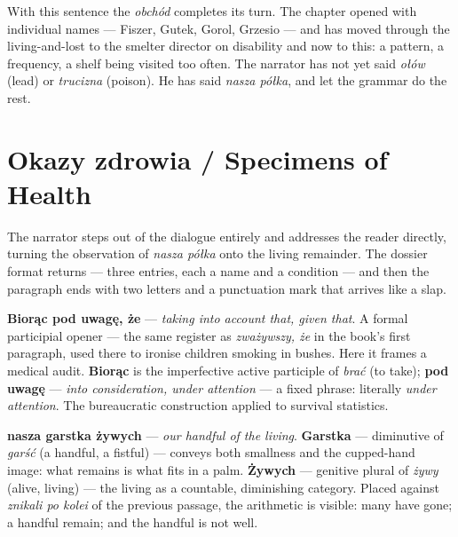 \medskip
With this sentence the \textit{obchód} completes its turn.
The chapter opened with individual names --- Fiszer,
Gutek, Gorol, Grzesio --- and has moved through the
living-and-lost to the smelter director on disability and
now to this: a pattern, a frequency, a shelf being
visited too often. The narrator has not yet said
\textit{ołów} (lead) or \textit{trucizna} (poison). He
has said \textit{nasza półka}, and let the grammar do
the rest.

\section{Okazy zdrowia / Specimens of Health}



The narrator steps out of the dialogue entirely and
addresses the reader directly, turning the observation
of \textit{nasza półka} onto the living remainder.
The dossier format returns --- three entries, each a
name and a condition --- and then the paragraph ends
with two letters and a punctuation mark that arrives
like a slap.

\textbf{Biorąc pod uwagę, że} --- \textit{taking into
account that, given that}. A formal participial opener ---
the same register as \textit{zważywszy, że} in the book's
first paragraph, used there to ironise children smoking in
bushes. Here it frames a medical audit. \textbf{Biorąc}
is the imperfective active participle of \textit{brać}
(to take); \textbf{pod uwagę} --- \textit{into
consideration, under attention} --- a fixed phrase:
literally \textit{under attention}. The bureaucratic
construction applied to survival statistics.

\textbf{nasza garstka żywych} --- \textit{our handful of
the living}. \textbf{Garstka} --- diminutive of
\textit{garść} (a handful, a fistful) --- conveys both
smallness and the cupped-hand image: what remains is
what fits in a palm. \textbf{Żywych} --- genitive plural
of \textit{żywy} (alive, living) --- the living as a
countable, diminishing category. Placed against
\textit{znikali po kolei} of the previous passage, the
arithmetic is visible: many have gone; a handful remain;
and the handful is not well.

